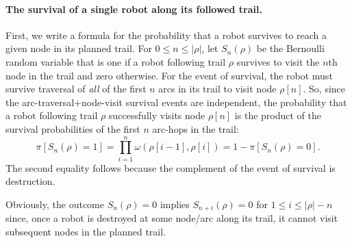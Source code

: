 \documentclass[11pt, oneside]{article}
\begin{document}
\paragraph{The survival of a single robot along its followed trail.} First, we write a formula for the probability that a robot survives to reach a given node in its planned trail.
For $0 \leq n \leq \lvert \rho \rvert$, 
let $S_n(\rho)$ be the Bernoulli random variable that is one if a robot following trail $\rho$ survives to visit the $n$th node in the trail and zero otherwise. For the event of survival, the robot must survive traversal of \emph{all} of the first $n$ arcs in its trail to visit node $\rho[n]$. So, since the arc-traversal$+$node-visit survival events are independent, the probability that a robot following trail $\rho$ successfully visits node $\rho[n]$ is the product of the survival probabilities of the first $n$ arc-hops in the trail:
\begin{equation}
	\pi[S_n(\rho) = 1] = \prod_{i=1}^n \omega(\rho[i-1], \rho[i]) 
	= 1 - \pi[S_n(\rho) = 0]. \label{eq:pi_S_n}
\end{equation} %
The second equality follows because the complement of the event of survival is destruction.

Obviously, the outcome $S_n(\rho)=0$ implies $S_{n+i}(\rho)=0$ for $1 \leq i \leq \lvert \rho \rvert-n$ since, once a robot is destroyed at some node/arc along its trail, it cannot visit subsequent nodes in the planned trail.
\end{document}

